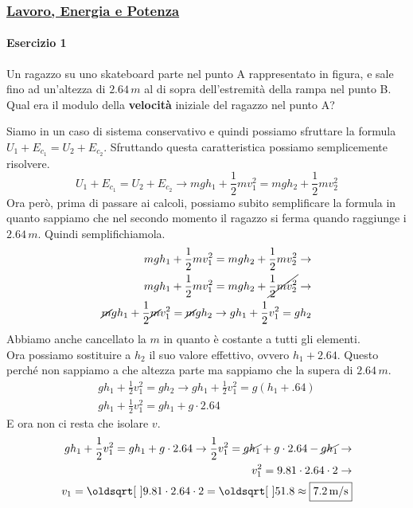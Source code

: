 \subsubsection*{\hyperref[subsec:dinamica:potenziale]{Lavoro, Energia e Potenza}}\label{ex:potenziale}
\paragraph{Esercizio 1}
Un ragazzo su uno skateboard parte nel punto A rappresentato in figura, e sale fino ad un'altezza
di $2.64\,m$ al di sopra dell'estremità della rampa nel punto B. Qual era il modulo della
\textbf{velocità} iniziale del ragazzo nel punto A?

\begin{center}
\end{center}
\divisor

Siamo in un caso di sistema conservativo e quindi possiamo sfruttare la formula $U_1+E_{c_1} = 
U_2 + E_{c_2}$. Sfruttando questa caratteristica possiamo semplicemente risolvere.
\begin{equation*}
U_1+E_{c_1} = U_2 + E_{c_2} \rightarrow mgh_1 + \frac{1}{2}mv_1^2 = mgh_2 + \frac{1}{2}mv_2^2
\end{equation*}
Ora però, prima di passare ai calcoli, possiamo subito semplificare la formula in quanto sappiamo
che nel secondo momento il ragazzo si ferma quando raggiunge i $2.64\,m$. Quindi semplifichiamola.
\begin{align*}
mgh_1 + \frac{1}{2}mv_1^2 = mgh_2 + \frac{1}{2}mv_2^2 \rightarrow \\
mgh_1 + \frac{1}{2}mv_1^2 = mgh_2 + \cancel{\frac{1}{2}mv_2^2} \rightarrow\\
\cancel{m}gh_1 + \frac{1}{2}\cancel{m}v_1^2 = \cancel{m}gh_2 \rightarrow
gh_1 + \frac{1}{2}v_1^2 = gh_2
\end{align*}
Abbiamo anche cancellato la $m$ in quanto è costante a tutti gli elementi.\\
Ora possiamo sostituire a $h_2$ il suo valore effettivo, ovvero $h_1+2.64$. Questo perché non 
sappiamo a che altezza parte ma sappiamo che la supera di $2.64\,m$.
\begin{align*}
gh_1 + \frac{1}{2}v_1^2 = gh_2 \rightarrow gh_1 + \frac{1}{2}v_1^2 = g\left(h_1+.64\right)\\
gh_1 + \frac{1}{2}v_1^2 = gh_1 + g\cdot2.64
\end{align*}
E ora non ci resta che isolare $v$.
\begin{align*}
gh_1 + \frac{1}{2}v_1^2 = gh_1 + g\cdot2.64 \rightarrow
\frac{1}{2}v_1^2 = \cancel{gh_1} + g\cdot2.64 -\cancel{gh_1} \rightarrow\\
v_1^2 = 9.81\cdot2.64\cdot2 \rightarrow\\
v_1 = \sqrt{9.81\cdot2.64\cdot2} = \sqrt{51.8}
\approx\boxed{7.2\,\text{m/s}}
\end{align*}

